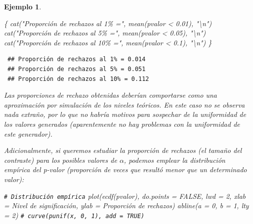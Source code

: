 \documentclass[
]{book}
\newenvironment{Shaded}{\begin{snugshade}}{\end{snugshade}}
\newcommand{\AttributeTok}[1]{\textcolor[rgb]{0.77,0.63,0.00}{#1}}
\newcommand{\CommentTok}[1]{\textcolor[rgb]{0.56,0.35,0.01}{\textit{#1}}}
\newcommand{\ConstantTok}[1]{\textcolor[rgb]{0.00,0.00,0.00}{#1}}
\newcommand{\DecValTok}[1]{\textcolor[rgb]{0.00,0.00,0.81}{#1}}
\newcommand{\FloatTok}[1]{\textcolor[rgb]{0.00,0.00,0.81}{#1}}
\newcommand{\FunctionTok}[1]{\textcolor[rgb]{0.00,0.00,0.00}{#1}}
\newcommand{\NormalTok}[1]{#1}
\newcommand{\SpecialCharTok}[1]{\textcolor[rgb]{0.00,0.00,0.00}{#1}}
\newcommand{\StringTok}[1]{\textcolor[rgb]{0.31,0.60,0.02}{#1}}
\theoremstyle{break}
\newtheorem{example}{Ejemplo}[chapter]
\theoremstyle{nonumberplain}
\renewcommand{\CommentTok}[1]{\textcolor[rgb]{0.41,0.41,0.41}{\texttt{#1}}}
\begin{document}
\begin{example}
\begin{Shaded}
\begin{Highlighting}[]
\NormalTok{\{}
\FunctionTok{cat}\NormalTok{(}\StringTok{"Proporción de rechazos al 1\% ="}\NormalTok{, }\FunctionTok{mean}\NormalTok{(pvalor }\SpecialCharTok{\textless{}} \FloatTok{0.01}\NormalTok{), }\StringTok{"}\SpecialCharTok{\textbackslash{}n}\StringTok{"}\NormalTok{)}
\FunctionTok{cat}\NormalTok{(}\StringTok{"Proporción de rechazos al 5\% ="}\NormalTok{, }\FunctionTok{mean}\NormalTok{(pvalor }\SpecialCharTok{\textless{}} \FloatTok{0.05}\NormalTok{), }\StringTok{"}\SpecialCharTok{\textbackslash{}n}\StringTok{"}\NormalTok{)}
\FunctionTok{cat}\NormalTok{(}\StringTok{"Proporción de rechazos al 10\% ="}\NormalTok{, }\FunctionTok{mean}\NormalTok{(pvalor }\SpecialCharTok{\textless{}} \FloatTok{0.1}\NormalTok{), }\StringTok{"}\SpecialCharTok{\textbackslash{}n}\StringTok{"}\NormalTok{)}
\NormalTok{\}}
\end{Highlighting}
\end{Shaded}

\begin{verbatim}
 ## Proporción de rechazos al 1% = 0.014 
 ## Proporción de rechazos al 5% = 0.051 
 ## Proporción de rechazos al 10% = 0.112
\end{verbatim}

Las proporciones de rechazo obtenidas deberían comportarse como una aproximación por simulación de los niveles teóricos.
En este caso no se observa nada extraño, por lo que no habría motivos para sospechar de la uniformidad de los valores generados (aparentemente no hay problemas con la uniformidad de este generador).

Adicionalmente, si queremos estudiar la proporción de rechazos (el \emph{tamaño del contraste}) para los posibles valores de \(\alpha\), podemos emplear la distribución empírica del p-valor (proporción de veces que resultó menor que un determinado valor):

\begin{Shaded}
\begin{Highlighting}[]
\CommentTok{\# Distribución empírica}
\FunctionTok{plot}\NormalTok{(}\FunctionTok{ecdf}\NormalTok{(pvalor), }\AttributeTok{do.points =} \ConstantTok{FALSE}\NormalTok{, }\AttributeTok{lwd =} \DecValTok{2}\NormalTok{, }
     \AttributeTok{xlab =} \StringTok{\textquotesingle{}Nivel de significación\textquotesingle{}}\NormalTok{, }\AttributeTok{ylab =} \StringTok{\textquotesingle{}Proporción de rechazos\textquotesingle{}}\NormalTok{)}
\FunctionTok{abline}\NormalTok{(}\AttributeTok{a =} \DecValTok{0}\NormalTok{, }\AttributeTok{b =} \DecValTok{1}\NormalTok{, }\AttributeTok{lty =} \DecValTok{2}\NormalTok{)   }\CommentTok{\# curve(punif(x, 0, 1), add = TRUE)}
\end{Highlighting}
\end{Shaded}


\end{example}
\end{document}
